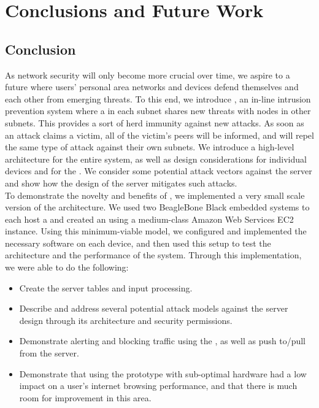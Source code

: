 \section{Conclusions and Future Work}
\label{sec:concl}

\subsection{Conclusion}
\label{sec:concl:main}
As network security will only become more crucial over time, we aspire to a future where users' personal area networks and devices defend themselves and each other from emerging threats. To this end, we introduce \sysname, an in-line intrusion prevention system where a \nodename in each subnet shares new threats with nodes in other subnets. This provides a sort of herd immunity against new attacks. As soon as an attack claims a victim, all of the victim's peers will be informed, and will repel the same type of attack against their own subnets. We introduce a high-level architecture for the entire system, as well as design considerations for individual devices and for the \servname. We consider some potential attack vectors against the server and show how the design of the server mitigates such attacks.  \\
To demonstrate the novelty and benefits of \sysname, we implemented a very small scale version of the architecture. We used two BeagleBone Black embedded systems to each host a \nodename and created an \sysname using a medium-class Amazon Web Services EC2 instance. Using this minimum-viable model, we configured and implemented the necessary software on each device, and then used this setup to test the architecture and the performance of the \sysname system. Through this implementation, we were able to do the following:

\begin{itemize}
    \item Create the \servname server tables and input processing.
    \item Describe and address several potential attack models against the \servname server design through its architecture and security permissions.
    \item Demonstrate alerting and blocking traffic using the \nodename, as well as push to/pull from the \servname server.
    \item Demonstrate that using the prototype \nodename with sub-optimal hardware had a low impact on a user's internet browsing performance, and that there is much room for improvement in this area.
\end{itemize}

